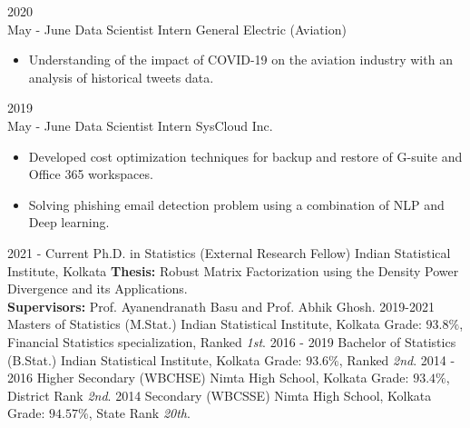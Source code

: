 \documentclass[10pt]{developercv} %
\begin{document}
\begin{entrylist}
{\begin{itemize}[noitemsep,topsep=0pt,parsep=0pt,partopsep=0pt, leftmargin=10pt]
        \end{itemize}
    }
    \entry
    {2020\\\footnotesize{May - June}}
    {Data Scientist Intern}
    {General Electric (Aviation)}
    {\vspace{-7pt}\small
        \begin{itemize}[noitemsep,topsep=0pt,parsep=0pt,partopsep=0pt, leftmargin=10pt]
            \item Understanding of the impact of COVID-19 on the aviation industry with an analysis of historical tweets data.
        \end{itemize}
    }
    \entry
    {2019\\\footnotesize{May - June}}
    {Data Scientist Intern}
    {SysCloud Inc.}
    {\vspace{-7pt}
    \small
        \begin{itemize}[noitemsep,topsep=0pt,parsep=0pt,partopsep=0pt, leftmargin=10pt]
            \item Developed cost optimization techniques for backup and restore of G-suite and Office 365 workspaces.
            \item Solving phishing email detection problem using a combination of NLP and Deep learning.
        \end{itemize}
    }
\end{entrylist}


\begin{entrylist}
    \entry
    {2021 - Current}
    {Ph.D. in Statistics (External Research Fellow)}
    {Indian Statistical Institute, Kolkata}
    {\textbf{Thesis:} Robust Matrix Factorization using the Density Power Divergence and its Applications. \\
    \textbf{Supervisors:} Prof. Ayanendranath Basu and Prof. Abhik Ghosh.}
    \entry
    {2019-2021}
    {Masters of Statistics (M.Stat.)}
    {Indian Statistical Institute, Kolkata}
    {Grade: $93.8\%$, Financial Statistics specialization, Ranked \emph{1st}.}
    \entry
    {2016 - 2019}
    {Bachelor of Statistics (B.Stat.)}
    {Indian Statistical Institute, Kolkata}
    {Grade: $93.6\%$, Ranked \emph{2nd}.}
    \entry
    {2014 - 2016}
    {Higher Secondary (WBCHSE)}
    {Nimta High School, Kolkata}
    {Grade: $93.4\%$, District Rank \emph{2nd}.}
    \entry
    {2014}
    {Secondary (WBCSSE)}
    {Nimta High School, Kolkata}
    {Grade: $94.57\%$, State Rank \emph{20th}.}
\end{entrylist}
\end{document}
